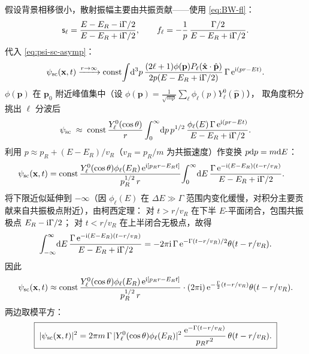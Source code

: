 假设背景相移很小，散射振幅主要由共振贡献——使用 \eqref{eq:BW-fl}：
\begin{equation}
  \mathsf{s}_\ell=\frac{E-E_R-\mathrm{i}\Gamma/2}{E-E_R+\mathrm{i}\Gamma/2},\qquad
  f_\ell=-\frac{1}{p}\,\frac{\Gamma/2}{E-E_R+\mathrm{i}\Gamma/2}.
\end{equation}
代入 \eqref{eq:psi-sc-asymp}：
\begin{equation}
  \psi_{\mathrm{sc}}(\mathbf x,t)\xrightarrow{r\to\infty}
  \mathrm{const}\!\int\!\mathrm{d}^3 p\,
  \frac{(2\ell+1)\phi(\mathbf p)P_\ell(\hat{\mathbf x}\cdot\hat{\mathbf p})}
  {2p(E-E_R+\mathrm{i}\Gamma/2)}\,\Gamma\,\mathrm{e}^{\mathrm{i}(p r-E t)}.
\end{equation}
$\phi(\mathbf p)$ 在 $\mathbf p_0$ 附近峰值集中（设 $\phi(\mathbf p)=\frac{1}{\sqrt{mp}}\sum_\ell \phi_\ell(p)Y^0_\ell(\hat{\mathbf p})$），
取角度积分挑出 $\ell$ 分波后
\begin{equation}
  \psi_{\mathrm{sc}}\;\approx\;\mathrm{const}\,
  \frac{Y^0_\ell(\cos\theta)}{r}\int_0^\infty\!\mathrm{d} p\,p^{1/2}\,
  \frac{\phi_\ell(E)\,\Gamma\,\mathrm{e}^{\mathrm{i}(p r-E t)}}{E-E_R+\mathrm{i}\Gamma/2}.
\end{equation}
利用 $p\approx p_R+(E-E_R)/v_R$（$v_R=p_R/m$ 为共振速度）作变换
$p\mathrm{d} p=m\mathrm{d} E$：
\begin{align}
  \psi_{\mathrm{sc}}(\mathbf x,t)
  &= \mathrm{const}\,\frac{Y_\ell^0(\cos\theta)\phi_\ell(E_R)\,\mathrm{e}^{\mathrm{i}[p_R r-E_R t]}}{p_R^{1/2}\,r}\!
     \int_0^\infty\!\mathrm{d} E\,\frac{\Gamma\,\mathrm{e}^{-\mathrm{i}(E-E_R)(t-r/v_R)}}{E-E_R+\mathrm{i}\Gamma/2} .
\end{align}
将下限近似延伸到 $-\infty$（因 $\phi_\ell(E)$ 在 $\Delta E\gg\Gamma$
范围内变化缓慢，对积分主要贡献来自共振极点附近），由柯西定理：
对 $t>r/v_R$ 在下半 $E$-平面闭合，包围共振极点 $E_R-\mathrm{i}\Gamma/2$；
对 $t<r/v_R$ 在上半闭合无极点，故得
\begin{equation}
  \int_{-\infty}^{\infty}\!\mathrm{d} E\,\frac{\Gamma\,\mathrm{e}^{-\mathrm{i}(E-E_R)(t-r/v_R)}}{E-E_R+\mathrm{i}\Gamma/2}
  =-2\pi\mathrm{i}\,\Gamma\,\mathrm{e}^{-\Gamma(t-r/v_R)/2}\theta(t-r/v_R).
\end{equation}
因此
\begin{equation}\label{eq:psi-sc-decay}
  \psi_{\mathrm{sc}}(\mathbf x,t)\approx
  \mathrm{const}\,\frac{Y_\ell^0(\cos\theta)\phi_\ell(E_R)\,\mathrm{e}^{\mathrm{i}[p_R r-E_R t]}}{p_R^{1/2}\,r}\cdot
  (2\pi\mathrm{i})\,\mathrm{e}^{-\frac{\Gamma}{2}(t-r/v_R)}\theta(t-r/v_R).
\end{equation}
两边取模平方：
\begin{equation}\label{eq:psi-sc-decay-sq}
  \boxed{\;|\psi_{\mathrm{sc}}(\mathbf x,t)|^2
  =2\pi m\,\Gamma\,|Y_\ell^0(\cos\theta)\phi_\ell(E_R)|^2\,
  \frac{\mathrm{e}^{-\Gamma(t-r/v_R)}}{p_R r^2}\,\theta(t-r/v_R) .\;}
\end{equation}

